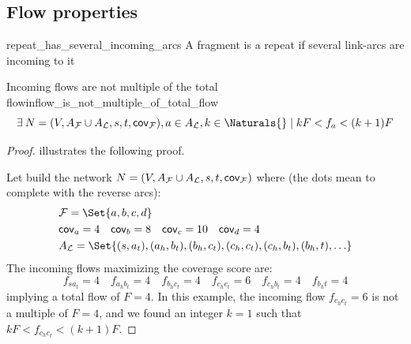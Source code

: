 \subsection{Flow properties}

\begin{proposition}{}{repeat_has_several_incoming_arcs}
  A fragment is a repeat if several link-arcs are incoming to it
\end{proposition}

\begin{proposition}{Incoming flows are not multiple of the total flow}{inflow_is_not_multiple_of_total_flow}
  \[
    \exists N = (V, A_\Fragments{} \cup A_\Links{}, s, t, \cov{\Fragments{}}), a \in A_\Links{}, k \in \Naturals{}
    \mid k F < f_a < (k + 1) F
  \]
\end{proposition}

\begin{proof}
   illustrates the following proof.

  Let build the network \(N = (V, A_{\mathcal{F}}{} \cup A_{\mathcal{L}}{}, s, t, \mathsf{cov}_{\mathcal{F}{}})\) where (the dots mean to complete with the reverse arcs):
  \begin{align*}
    & \Fragments{} = \Set{a, b, c, d} \\
    & \cov{a} = 4 \quad \cov{b} = 8 \quad \cov{c} = 10 \quad \cov{d} = 4 \\
    & A_\Links{} = \Set{
      (s, a_t), (a_h, b_t), (b_h, c_t), (c_h, c_t), (c_h, b_t), (b_h, t), \ldots
    }
  \end{align*}
  The incoming flows maximizing the coverage score are:
  \[
    f_{s a_t} = 4 \quad f_{a_h b_t} = 4 \quad f_{b_h c_t} = 4 \quad f_{c_h c_t} = 6 \quad f_{c_h b_t} = 4 \quad f_{b_h t} = 4
  \] implying a total flow of \(F = 4\).
  In this example, the incoming flow \(f_{c_h c_t} = 6\) is not a multiple of \(F = 4\), and we found an integer \(k = 1\) such that \(k F < f_{c_h c_t} < (k + 1) F\).
\end{proof}

